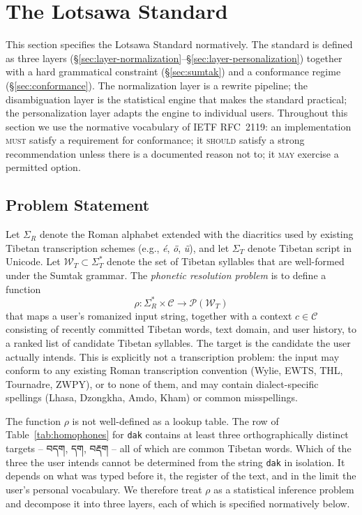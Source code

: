 \documentclass[11pt]{article}
\newcommand{\tib}[1]{{\fontspec{Jomolhari}#1}}
\begin{document}
\section{The Lotsawa Standard}
\label{sec:framework}

This section specifies the Lotsawa Standard normatively. The standard is defined as three layers (\S\ref{sec:layer-normalization}--\S\ref{sec:layer-personalization}) together with a hard grammatical constraint (\S\ref{sec:sumtak}) and a conformance regime (\S\ref{sec:conformance}). The normalization layer is a rewrite pipeline; the disambiguation layer is the statistical engine that makes the standard practical; the personalization layer adapts the engine to individual users. Throughout this section we use the normative vocabulary of IETF RFC~2119: an implementation \textsc{must} satisfy a requirement for conformance; it \textsc{should} satisfy a strong recommendation unless there is a documented reason not to; it \textsc{may} exercise a permitted option.

\subsection{Problem Statement}
\label{sec:problem-statement}

Let $\Sigma_R$ denote the Roman alphabet extended with the diacritics used by existing Tibetan transcription schemes (e.g., \textit{é}, \textit{ö}, \textit{ü}), and let $\Sigma_T$ denote Tibetan script in Unicode. Let $\mathcal{W}_T \subset \Sigma_T^*$ denote the set of Tibetan syllables that are well-formed under the Sumtak grammar. The \emph{phonetic resolution problem} is to define a function
\[
\rho: \Sigma_R^* \times \mathcal{C} \to \mathcal{P}(\mathcal{W}_T)
\]
that maps a user's romanized input string, together with a context $c \in \mathcal{C}$ consisting of recently committed Tibetan words, text domain, and user history, to a ranked list of candidate Tibetan syllables. The target is the candidate the user actually intends. This is explicitly not a transcription problem: the input may conform to any existing Roman transcription convention (Wylie, EWTS, THL, Tournadre, ZWPY), or to none of them, and may contain dialect-specific spellings (Lhasa, Dzongkha, Amdo, Kham) or common misspellings.

The function $\rho$ is not well-defined as a lookup table. The row of Table~\ref{tab:homophones} for \texttt{dak} contains at least three orthographically distinct targets -- \tib{བདག}, \tib{དག}, \tib{བརྡག} -- all of which are common Tibetan words. Which of the three the user intends cannot be determined from the string \texttt{dak} in isolation. It depends on what was typed before it, the register of the text, and in the limit the user's personal vocabulary. We therefore treat $\rho$ as a statistical inference problem and decompose it into three layers, each of which is specified normatively below.
\end{document}
